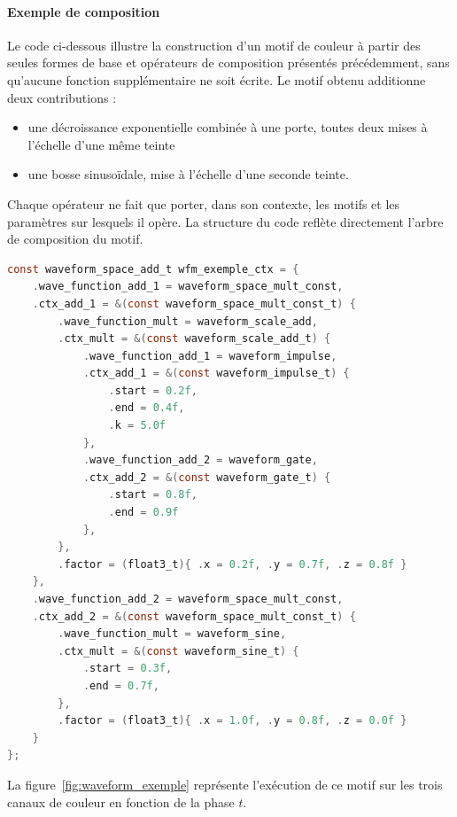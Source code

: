 \newpage

\paragraph{Exemple de composition} Le code ci-dessous illustre la construction d'un motif de couleur à partir des seules formes
de base et opérateurs de composition présentés précédemment, sans qu'aucune fonction supplémentaire ne soit écrite. Le motif
obtenu additionne deux contributions :
\begin{itemize}
	\item une décroissance exponentielle combinée à une porte, toutes deux mises à l'échelle d'une même teinte
	\item une bosse sinusoïdale, mise à l'échelle d'une seconde teinte.
\end{itemize}
Chaque opérateur ne fait que porter, dans son contexte, les motifs et les paramètres sur lesquels il opère. La structure du
code reflète directement l'arbre de composition du motif.
\begin{lstlisting}[language=C, frame=tb, basicstyle=\small]
const waveform_space_add_t wfm_exemple_ctx = {
    .wave_function_add_1 = waveform_space_mult_const,
    .ctx_add_1 = &(const waveform_space_mult_const_t) {
        .wave_function_mult = waveform_scale_add,
        .ctx_mult = &(const waveform_scale_add_t) {
            .wave_function_add_1 = waveform_impulse,
            .ctx_add_1 = &(const waveform_impulse_t) {
                .start = 0.2f,
                .end = 0.4f,
                .k = 5.0f
            },
            .wave_function_add_2 = waveform_gate,
            .ctx_add_2 = &(const waveform_gate_t) {
                .start = 0.8f,
                .end = 0.9f
            },
        },
        .factor = (float3_t){ .x = 0.2f, .y = 0.7f, .z = 0.8f }
    },
    .wave_function_add_2 = waveform_space_mult_const,
    .ctx_add_2 = &(const waveform_space_mult_const_t) {
        .wave_function_mult = waveform_sine,
        .ctx_mult = &(const waveform_sine_t) {
            .start = 0.3f,
            .end = 0.7f,
        },
        .factor = (float3_t){ .x = 1.0f, .y = 0.8f, .z = 0.0f }
    }
};
\end{lstlisting}

\vfill

\noindent La figure~\ref{fig:waveform_exemple} représente l'exécution de ce motif sur les trois canaux de couleur en fonction de
la phase $t$.


